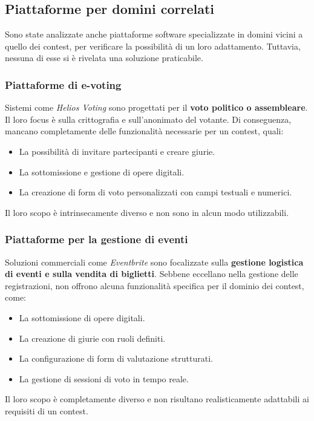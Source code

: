 \subsection{Piattaforme per domini correlati}\label{subsec:piattaforme-per-domini-correlati}
Sono state analizzate anche piattaforme software specializzate in domini vicini a quello dei contest, per verificare la possibilità di un loro adattamento.
Tuttavia, nessuna di esse si è rivelata una soluzione praticabile.

\subsubsection{Piattaforme di e-voting}
Sistemi come \textit{Helios Voting} sono progettati per il \textbf{voto politico o assembleare}.
Il loro focus è sulla crittografia e sull'anonimato del votante.
Di conseguenza, mancano completamente delle funzionalità necessarie per un contest, quali:
\begin{itemize}
    \item La possibilità di invitare partecipanti e creare giurie.
    \item La sottomissione e gestione di opere digitali.
    \item La creazione di form di voto personalizzati con campi testuali e numerici.
\end{itemize}
Il loro scopo è intrinsecamente diverso e non sono in alcun modo utilizzabili.

\subsubsection{Piattaforme per la gestione di eventi}
Soluzioni commerciali come \textit{Eventbrite} sono focalizzate sulla \textbf{gestione logistica di eventi e sulla vendita di biglietti}.
Sebbene eccellano nella gestione delle registrazioni, non offrono alcuna funzionalità specifica per il dominio dei contest, come:
\begin{itemize}
    \item La sottomissione di opere digitali.
    \item La creazione di giurie con ruoli definiti.
    \item La configurazione di form di valutazione strutturati.
    \item La gestione di sessioni di voto in tempo reale.
\end{itemize}
Il loro scopo è completamente diverso e non risultano realisticamente adattabili ai requisiti di un contest.

